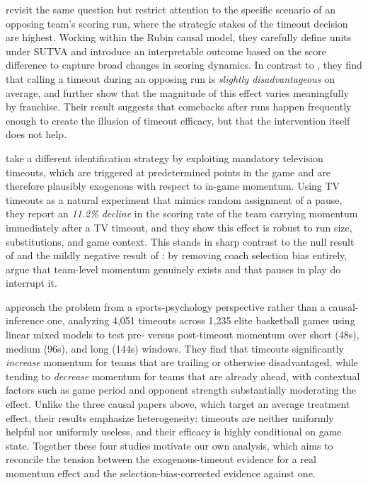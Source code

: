 \documentclass[twoside,11pt]{article}
\begin{document}
\citet{gibbs2021causal} revisit the same question but restrict attention to the specific scenario of an
opposing team's scoring run, where the strategic stakes of the timeout decision are highest. Working within
the Rubin causal model, they carefully define units under SUTVA and introduce an interpretable outcome based
on the score difference to capture broad changes in scoring dynamics. In contrast to \citet{assis2020stop},
they find that calling a timeout during an opposing run is \emph{slightly disadvantageous} on average, and
further show that the magnitude of this effect varies meaningfully by franchise. Their result suggests that
comebacks after runs happen frequently enough to create the illusion of timeout efficacy, but that the
intervention itself does not help.

\citet{weimer2023causal} take a different identification strategy by exploiting mandatory television
timeouts, which are triggered at predetermined points in the game and are therefore plausibly exogenous with
respect to in-game momentum. Using TV timeouts as a natural experiment that mimics random assignment of a
pause, they report an \emph{11.2\% decline} in the scoring rate of the team carrying momentum immediately
after a TV timeout, and they show this effect is robust to run size, substitutions, and game context. This
stands in sharp contrast to the null result of \citet{assis2020stop} and the mildly negative result of
\citet{gibbs2021causal}: by removing coach selection bias entirely, \citet{weimer2023causal} argue that
team-level momentum genuinely exists and that pauses in play do interrupt it.

\citet{qiu2025interrupt} approach the problem from a sports-psychology perspective rather than a
causal-inference one, analyzing 4{,}051 timeouts across 1{,}235 elite basketball games using linear mixed
models to test pre- versus post-timeout momentum over short (48s), medium (96s), and long (144s) windows.
They find that timeouts significantly \emph{increase} momentum for teams that are trailing or otherwise
disadvantaged, while tending to \emph{decrease} momentum for teams that are already ahead, with contextual
factors such as game period and opponent strength substantially moderating the effect. Unlike the three
causal papers above, which target an average treatment effect, their results emphasize heterogeneity:
timeouts are neither uniformly helpful nor uniformly useless, and their efficacy is highly conditional on
game state. Together these four studies motivate our own analysis, which aims to reconcile the tension
between the exogenous-timeout evidence for a real momentum effect and the selection-bias-corrected evidence against one.
\end{document}
